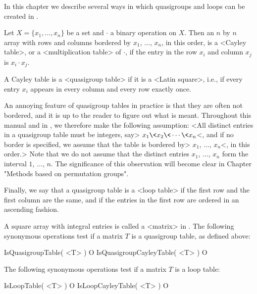 
In this chapter we describe several ways in which quasigroups and loops can be created in {\LOOPS}.


Let $X=\{x_1,\dots,x_n\}$ be a set and $\cdot$ a binary operation on $X$. Then
an $n$ by $n$ array with rows and columns bordered by $x_1$, $\dots$, $x_n$, in
this order, is a <Cayley table>, or a <multiplication
table> of $\cdot$, if the entry in the row $x_i$
and column $x_j$ is $x_i\cdot x_j$.

A Cayley table is a <quasigroup table> if it is a
<Latin square>, i.e., if every entry $x_i$ appears in every
column and every row exactly once.

An annoying feature of quasigroup tables in practice is that they are often not
bordered, and it is up to the reader to figure out what is meant. Throughout
this manual and in {\LOOPS}, we therefore make the following assumption: <All
distinct entries in a quasigroup table must be integers, say>
$x_1\<x_2\<\cdots\<x_n$<, and if no border is specified, we assume that the
table is bordered by> $x_1$, $\dots$, $x_n$<, in this order.> Note that we do
not assume that the distinct entries $x_1$, $\dots$, $x_n$ form the interval
$1$, $\dots$, $n$. The significance of this observation will become clear in
Chapter "Methods based on permutation groups".

Finally, we say that a quasigroup table is a <loop table> if
the first row and the first column are the same, and if the entries in the
first row are ordered in an ascending fashion.


A square array with integral entries is called a <matrix> in {\GAP}. The
following synonymous operations test if a matrix $T$ is a quasigroup table, as
defined above:

\>IsQuasigroupTable( <T> ) O
\>IsQuasigroupCayleyTable( <T> ) O

The following synonymous operations test if a matrix $T$ is a loop table:

\>IsLoopTable( <T> ) O
\>IsLoopCayleyTable( <T> ) O

